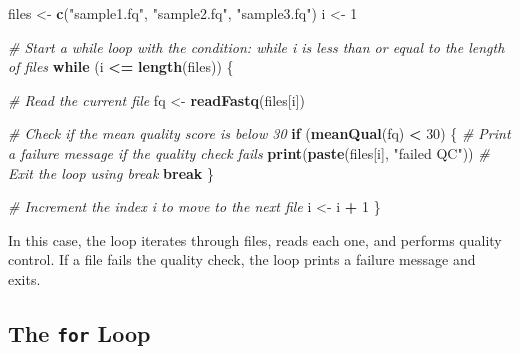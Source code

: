 \documentclass[
]{book}
\newenvironment{Shaded}{\begin{snugshade}}{\end{snugshade}}
\newcommand{\CommentTok}[1]{\textcolor[rgb]{0.56,0.35,0.01}{\textit{#1}}}
\newcommand{\ControlFlowTok}[1]{\textcolor[rgb]{0.13,0.29,0.53}{\textbf{#1}}}
\newcommand{\DecValTok}[1]{\textcolor[rgb]{0.00,0.00,0.81}{#1}}
\newcommand{\FunctionTok}[1]{\textcolor[rgb]{0.13,0.29,0.53}{\textbf{#1}}}
\newcommand{\NormalTok}[1]{#1}
\newcommand{\OtherTok}[1]{\textcolor[rgb]{0.56,0.35,0.01}{#1}}
\newcommand{\SpecialCharTok}[1]{\textcolor[rgb]{0.81,0.36,0.00}{\textbf{#1}}}
\newcommand{\StringTok}[1]{\textcolor[rgb]{0.31,0.60,0.02}{#1}}
\begin{document}
\begin{Shaded}
\begin{Highlighting}[]
\NormalTok{files }\OtherTok{\textless{}{-}} \FunctionTok{c}\NormalTok{(}\StringTok{"sample1.fq"}\NormalTok{, }\StringTok{"sample2.fq"}\NormalTok{, }\StringTok{"sample3.fq"}\NormalTok{)}
\NormalTok{i }\OtherTok{\textless{}{-}} \DecValTok{1}

\CommentTok{\# Start a \textasciigrave{}while\textasciigrave{} loop with the condition: while \textasciigrave{}i\textasciigrave{} is less than or equal to the length of \textasciigrave{}files\textasciigrave{}}
\ControlFlowTok{while}\NormalTok{ (i }\SpecialCharTok{\textless{}=} \FunctionTok{length}\NormalTok{(files)) \{}
  
  \CommentTok{\# Read the current file}
\NormalTok{  fq }\OtherTok{\textless{}{-}} \FunctionTok{readFastq}\NormalTok{(files[i])}
  
  \CommentTok{\# Check if the mean quality score is below 30}
  \ControlFlowTok{if}\NormalTok{ (}\FunctionTok{meanQual}\NormalTok{(fq) }\SpecialCharTok{\textless{}} \DecValTok{30}\NormalTok{) \{}
     \CommentTok{\# Print a failure message if the quality check fails}
     \FunctionTok{print}\NormalTok{(}\FunctionTok{paste}\NormalTok{(files[i], }\StringTok{"failed QC"}\NormalTok{))}
     \CommentTok{\# Exit the loop using \textasciigrave{}break\textasciigrave{}}
     \ControlFlowTok{break}
\NormalTok{  \} }
  
  \CommentTok{\# Increment the index \textasciigrave{}i\textasciigrave{} to move to the next file}
\NormalTok{  i }\OtherTok{\textless{}{-}}\NormalTok{ i }\SpecialCharTok{+} \DecValTok{1}
\NormalTok{\}}
\end{Highlighting}
\end{Shaded}

In this case, the loop iterates through files, reads each one, and performs quality control. If a file fails the quality check, the loop prints a failure message and exits.

\hypertarget{the-for-loop}{%
\subsection{\texorpdfstring{The \texttt{for} Loop}{The for Loop}}\label{the-for-loop}}
\end{document}
